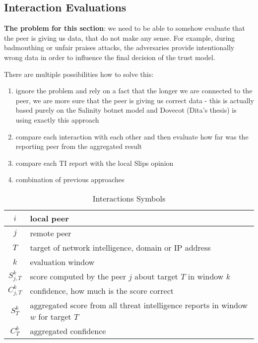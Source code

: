 \subsection{Interaction Evaluations}

\textbf{The problem for this section}: we need to be able to somehow evaluate that the peer is giving us data, that do not make any sense. 
For example, during badmouthing or unfair praises attacks, the adversaries provide intentionally wrong data in order to influence the final decision of the trust model.

There are multiple possibilities how to solve this:
\begin{enumerate}
\item ignore the problem and rely on a fact that the longer we are connected to the peer, we are more sure that the peer is giving us correct data - this is actually based purely on the Salinity botnet model and Dovecot (Dita's thesis) is using exactly this approach
\item compare each interaction with each other and then evaluate how far was the reporting peer from the aggregated result
\item compare each TI report with the local Slips opinion 
\item combination of previous approaches
\end{enumerate}

\begin{table}[h!]
\centering
\begin{tabular}{ c | m{20em} }
 $i$ & local peer \\
 \hline
 $j$ & remote peer \\
 \hline
 $T$ & target of network intelligence, domain or IP address \\
 \hline
 $k$ & evaluation window \\
 \hline
 $S^{k}_{j, T}$ & score computed by the peer $j$ about target $T$ in window $k$ \\
 \hline
 $C^{k}_{j, T}$ & confidence, how much is the score correct \\
 \hline
 $S^{k}_{T}$ & aggregated score from all threat intelligence reports in window $w$ for target $T$ \\
 \hline
 $C^{k}_{T}$ & aggregated confidence
\end{tabular}
\caption{Interactions Symbols}
\label{table:interaction-eval}
\end{table}


